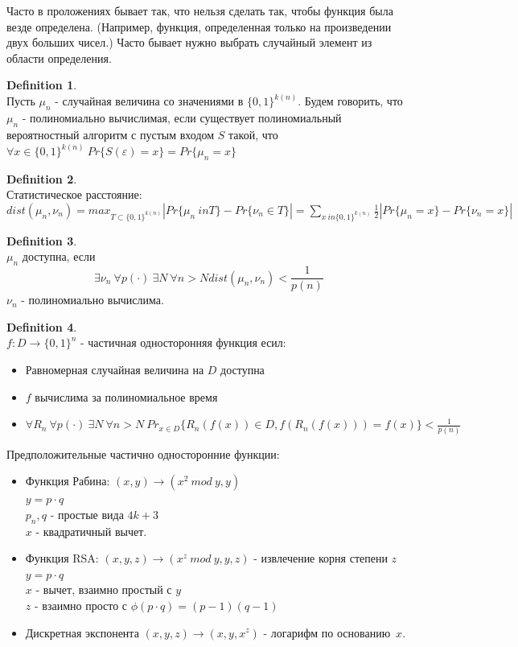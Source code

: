 \documentclass[a4paper]{article}
\theoremstyle{definition}
\newtheorem{definition}{Definition}
\theoremstyle{plain}
\begin{document}
\noindent Часто в проложениях бывает так, что нельзя сделать так, чтобы функция была везде определена.
	(Например, функция, определенная только на произведении двух больших чисел.) Часто бывает нужно выбрать
	случайный элемент из области определения.

\begin{definition}~\\
	Пусть $\mu_n$ - случайная величина со значениями в $\{0, 1\}^{k(n)}$. Будем говорить, что
	$\mu_n$ - полиномиально вычислимая, если существует полиномиальный вероятностный алгоритм с пустым
	входом $S$ такой, что $\forall x \in \{0, 1\}^{k(n)}\ Pr\{S(\varepsilon) = x\} = Pr\{\mu_n = x\}$
\end{definition}

\begin{definition}~\\
	Статистическое расстояние: $dist(\mu_n, \nu_n) = max_{T \subset \{0, 1\}^{k(n)}} |Pr\{\mu_n \ in T \} - Pr\{\nu_n \in T \}| = \sum_{x \ in \{0, 1\}^{k(n)}} \frac{1}{2}|Pr\{\mu_n = x \} - Pr\{\nu_n = x \}|$
\end{definition}

\begin{definition}~\\
	$\mu_n$ доступна, если
	$$
		\exists \nu_n\ \forall p(\cdot)\ \exists N\ \forall n > N dist(\mu_n, \nu_n) < \frac{1}{p(n)}
	$$
	$\nu_n$ - полиномиально вычислима.
\end{definition}

\begin{definition}~\\
	$f\colon D \rightarrow \{0, 1\}^n$ - частичная односторонняя функция есил:
	\begin{itemize}
		\item Равномерная случайная величина на $D$ доступна
		\item $f$ вычислима за полиномиальное время
		\item $\forall R_n\ \forall p(\cdot)\ \exists N\ \forall n > N\ Pr_{x \in D}\{R_n(f(x)) \in D, f(R_n(f(x))) = f(x)\} < \frac{1}{p(n)}$
	\end{itemize}
\end{definition}

\noindent Предположительные частично односторонние функции:
\begin{itemize}
		\item Функция Рабина: $(x, y) \rightarrow (x^2\ mod\ y, y)$~\\
			$y = p \cdot q$~\\
			$p_n, q$ - простые вида $4k + 3$~\\
			$x$ - квадратичный вычет.
		\item Функция RSA: $(x, y, z) \rightarrow (x^z\ mod\ y, y, z)$ - извлечение корня степени $z$~\\
			$y = p \cdot q$~\\
			$x$ - вычет, взаимно простый с $y$~\\
			$z$ - взаимно просто с $\phi(p\cdot q) = (p - 1)(q - 1)$
		\item Дискретная экспонента $(x, y, z) \rightarrow (x, y, x^z)$ - логарифм по основанию~$x$.
	\end{itemize}
\end{document}
